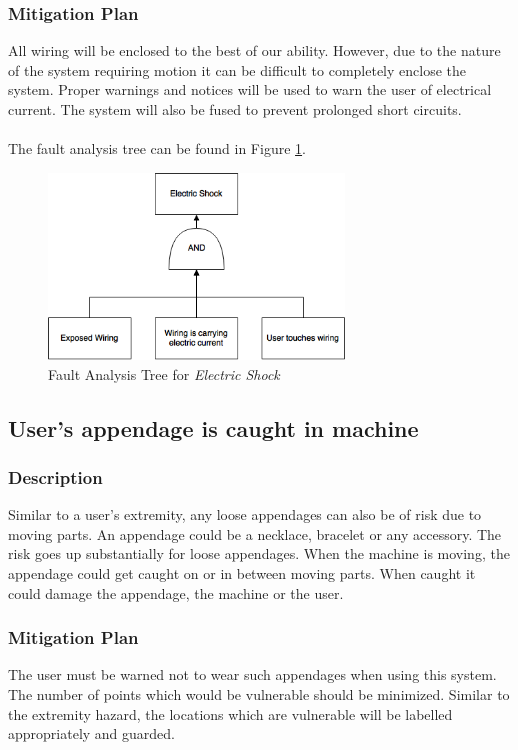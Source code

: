 \documentclass[11pt]{article}
\begin{document}
\subsubsection*{Mitigation Plan}
All wiring will be enclosed to the best of our ability. However, due to the nature of the system requiring motion it can be difficult to completely enclose the system. Proper warnings and notices will be used to warn the user of electrical current. The system will also be fused to prevent prolonged short circuits. \\ \\

The fault analysis tree can be found in Figure \ref{fig:ft-electric}.

\begin{figure}[H]
   \centering
   \includegraphics[width=0.7\textwidth]{img/ft-electric.png} %
   \caption{Fault Analysis Tree for \textit{Electric Shock}}
   \label{fig:ft-electric}
\end{figure}

\subsection{User's appendage is caught in machine}
\subsubsection*{Description}
Similar to a user's extremity, any loose appendages can also be of risk due to moving parts. An appendage could be a necklace, bracelet or any accessory. The risk goes up substantially for loose appendages. When the machine is moving, the appendage could get caught on or in between moving parts. When caught it could damage the appendage, the machine or the user.
\subsubsection*{Mitigation Plan}
The user must be warned not to wear such appendages when using this system. The number of points which would be vulnerable should be minimized. Similar to the extremity hazard, the locations which are vulnerable will be labelled appropriately and guarded. \\ \\
\end{document}
